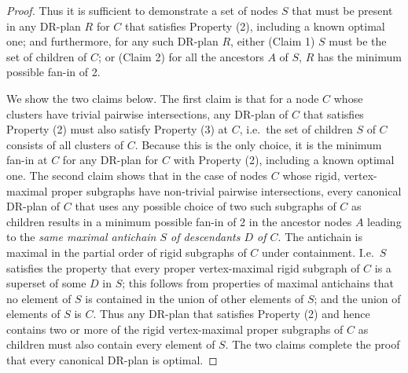 \begin{proof}
Thus it is sufficient to demonstrate a set of nodes $S$  that must be present in any  DR-plan $R$ for $C$ that satisfies Property (2), including a known optimal one; and furthermore, for any such DR-plan $R$,  either (Claim 1) $S$ must be the set of children of $C$; or (Claim 2) for all the ancestors $A$ of $S$, $R$ has the minimum possible fan-in of 2.

We show the two claims below.
The first claim is that for a node $C$ whose clusters have trivial pairwise intersections, any DR-plan of $C$ that satisfies Property (2) must also satisfy Property (3) at $C$, i.e.\ the set of children $S$ of $C$ consists of all clusters of $C$.
Because this is the only choice, it is the minimum fan-in at $C$ for any DR-plan for $C$ with Property (2), including a known optimal one.
The second claim shows that in the case of nodes $C$ whose rigid, vertex-maximal proper subgraphs have  non-trivial pairwise intersections, every canonical DR-plan of $C$ that uses any possible choice of two such subgraphs of $C$ as children results in a minimum possible fan-in of 2 in the ancestor nodes $A$ leading to the {\em same maximal antichain $S$ of descendants $D$ of $C$}. The antichain is maximal in the partial order of rigid subgraphs of $C$ under containment. I.e.\ $S$ satisfies the property that every proper vertex-maximal rigid subgraph of $C$ is a superset of some $D$ in $S$; this follows from properties of maximal antichains that no element of $S$ is contained in the union of other elements of $S$; and the union of elements of $S$ is $C$. Thus any  DR-plan that satisfies Property (2) and hence contains two or more of the rigid vertex-maximal proper subgraphs of $C$ as children must also contain every element of $S$. The two claims complete the proof that every canonical DR-plan is optimal.











\end{proof}
